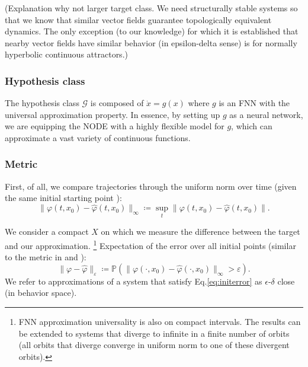 \documentclass{article}
\newcommand{\ascomment}[1]{\textcolor{ascolor}{(#1)}}
\theoremstyle{definition} \newtheorem{definition}{Definition}
\theoremstyle{remark} \newtheorem{remark}{Remark}
\newcommand{\vol}{\operatorname{vol}}
\newcounter{ct}
\begin{document}
\ascomment{Explanation why not larger target class. We need structurally stable systems so that we know that similar vector fields guarantee topologically equivalent dynamics. The only exception (to our knowledge) for which it is established that nearby vector fields have similar behavior (in epsilon-delta sense) is for normally hyperbolic continuous attractors.}

\subsubsection{Hypothesis class}\label{sec:hypothesis}
The hypothesis class $\mathcal{G}$ is composed of $\dot x = g(x)$
where $g$ is an FNN with the universal approximation property. %
In essence, by setting up $g$ as a neural network, we are equipping the NODE with a highly flexible model for $g$, which can approximate a vast variety of continuous functions. 



\subsubsection{Metric}\label{sec:metric}
First, of all, we compare trajectories through the uniform norm over time (given the same initial starting point \citep{girard2007approximation}):
\begin{equation}
\|\varphi(t,x_0)-\hat \varphi(t,x_0)\|_\infty \coloneqq \sup_t\|\varphi(t,x_0)-\hat \varphi(t,x_0)\|.
\end{equation}

We consider a compact $X$ on which we measure the difference between the target and our approximation.
\footnote{FNN approximation universality is also on compact intervals.
The results can be extended to systems that diverge to infinite in a finite number of orbits (all orbits that diverge converge in uniform norm to one of these divergent orbits).}
%
Expectation of the error over all initial points (similar to the metric in \citep{hammer2000approximation} and \citep{hanson2021learning}):
\begin{equation}\label{eq:initerror}
\|\varphi-\hat \varphi\|_\varepsilon \coloneqq  \mathbb{P}\left(\|\varphi(\cdot,x_0)-\hat \varphi(\cdot,x_0)\|_\infty>\varepsilon\right).
\end{equation}
We refer to approximations of a system that satisfy Eq.\ref{eq:initerror} as $\epsilon$-$\delta$ close (in behavior space).
\end{document}
